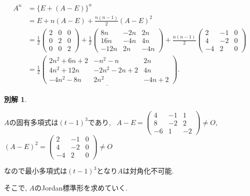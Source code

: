 \documentclass{jsarticle}
\newtheorem*{another*}{別解}
\begin{document}
$$
\begin{aligned}
A^n & = \{E+(A-E)\}^n \\
&=E+n(A-E)+\frac{n(n-1)}{2}(A-E)^2 \\
&=\frac{1}{2}\left(\begin{array}{lll}
2 & 0 & 0 \\
0 & 2 & 0 \\
0 & 0 & 2
\end{array}\right)+\frac{1}{2}\left(\begin{array}{ccc}
8 n & -2 n & 2 n \\
16 n & -4 n & 4 n \\
-12 n & 2 n & -4 n
\end{array}\right)+\frac{n(n-1)}{2}\left(\begin{array}{ccc}
2 & -1 & 0 \\
4 & -2 & 0 \\
-4 & 2 & 0
\end{array}\right) \\
&= \underline{\frac{1}{2}\left(\begin{array}{lll}
2n^2+6n+2 & -n^2-n & 2n \\
4n^2+12n & -2n^2-2n+2 & 4n \\
-4n^2-8n & 2n^2 & -4n+2
\end{array}\right)}.
\end{aligned}
$$

\bigskip
\bigskip

\begin{another*}
\end{another*}
$A$の固有多項式は$(t-1)^3$であり, \ 
$A-E=\left(\begin{array}{ccc}
4 & -1 & 1 \\
8 & -2 & 2 \\
-6 & 1 & -2
\end{array}\right) \neq O$, \ \ 
$(A-E)^2=\left(\begin{array}{ccc}
2 & -1 & 0 \\
4 & -2 & 0 \\
-4 & 2 & 0
\end{array}\right) \neq O$

なので最小多項式は$(t-1)^3$となり$A$は対角化不可能.

そこで, $A$のJordan標準形を求めていく.
\end{document}
